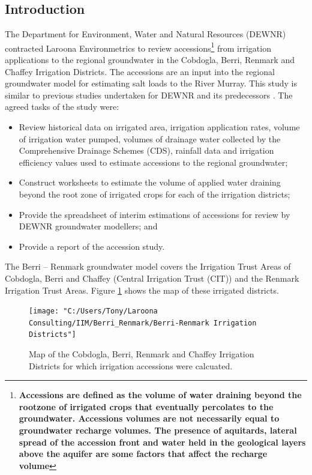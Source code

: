 \documentclass[a4paper, titlepage, 12pt]{article}\usepackage[]{graphicx}\usepackage[]{color}
\begin{document}
\begin{sffamily}
\section{Introduction}
The Department for Environment, Water and Natural Resources (DEWNR) contracted Laroona Environmetrics to review accessions\footnote{\footnotesize{\bfseries{Accessions} are defined as the volume of water draining beyond the rootzone of irrigated crops that eventually percolates to the groundwater. Accessions volumes are not necessarily equal to groundwater recharge volumes. The presence of aquitards, lateral spread of the accession front and water held in the geological layers above the aquifer are some factors that affect the recharge volume}} from irrigation applications to the regional groundwater in the Cobdogla, Berri, Renmark and Chaffey Irrigation Districts. The accessions are an input into the regional groundwater model for estimating salt loads to the River Murray. This study is similar to previous  studies undertaken for DEWNR and its predecessors \citep{Meissner2011a, Meissner2011b, Meissner2012, Meissner2014}. The agreed tasks of the study were:

\begin{itemize}
  \item Review historical data on irrigated area, irrigation application rates, volume of irrigation water pumped, volumes of drainage water collected by the Comprehensive Drainage Schemes (CDS), rainfall data and irrigation efficiency values used to estimate accessions to the regional groundwater;
  \item  Construct worksheets to estimate the volume of applied water draining beyond the root zone of irrigated crops for each of the irrigation districts;
  \item Provide the spreadsheet of interim estimations of accessions for review by DEWNR groundwater modellers; and
  \item Provide a report of the accession study.
\end{itemize}

The Berri -- Renmark groundwater model covers the Irrigation Trust Areas of Cobdogla,  Berri and Chaffey (Central Irrigation Trust (CIT)) and the Renmark Irrigation Trust Areas.  Figure \ref{fig01} shows the map of these irrigated districts.

\begin{figure}
\texttt{[image: "C:/Users/Tony/Laroona Consulting/IIM/Berri\_Renmark/Berri-Renmark Irrigation Districts"]}
\label{fig01}
\caption{Map of the Cobdogla, Berri, Renmark and Chaffey Irrigation Districts for which irrigation accessions were calcuated.}
\end{figure}


\end{sffamily}
\end{document}
